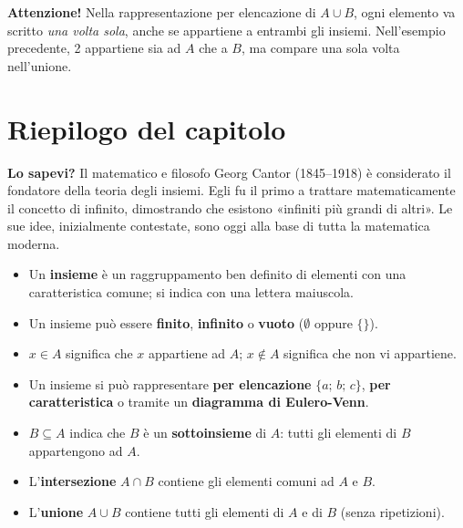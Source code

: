 \begin{attenzione}
\textbf{Attenzione!} Nella rappresentazione per elencazione di $A \cup B$, ogni elemento va scritto \emph{una volta sola}, anche se appartiene a entrambi gli insiemi. Nell'esempio precedente, 2 appartiene sia ad $A$ che a $B$, ma compare una sola volta nell'unione.
\end{attenzione}

\section*{Riepilogo del capitolo}

\begin{sapevi}
\textbf{Lo sapevi?} Il matematico e filosofo Georg Cantor (1845–1918) è considerato il fondatore della teoria degli insiemi. Egli fu il primo a trattare matematicamente il concetto di infinito, dimostrando che esistono «infiniti più grandi di altri». Le sue idee, inizialmente contestate, sono oggi alla base di tutta la matematica moderna.
\end{sapevi}

\bigskip

\begin{tcolorbox}[
  enhanced,
  breakable,
  colback  = azzurro,
  colframe = blu,
  fonttitle = \bfseries,
  title    = Riepilogo,
  left=6pt, right=6pt, top=4pt, bottom=4pt, arc=4pt
]
\begin{itemize}[leftmargin=1.5em]
  \item Un \textbf{insieme} è un raggruppamento ben definito di elementi con una caratteristica comune; si indica con una lettera maiuscola.
  \item Un insieme può essere \textbf{finito}, \textbf{infinito} o \textbf{vuoto} ($\emptyset$ oppure $\{\}$).
  \item $x \in A$ significa che $x$ appartiene ad $A$; $x \notin A$ significa che non vi appartiene.
  \item Un insieme si può rappresentare \textbf{per elencazione} $\{a;\,b;\,c\}$, \textbf{per caratteristica} o tramite un \textbf{diagramma di Eulero-Venn}.
  \item $B \subseteq A$ indica che $B$ è un \textbf{sottoinsieme} di $A$: tutti gli elementi di $B$ appartengono ad $A$.
  \item L'\textbf{intersezione} $A \cap B$ contiene gli elementi comuni ad $A$ e $B$.
  \item L'\textbf{unione} $A \cup B$ contiene tutti gli elementi di $A$ e di $B$ (senza ripetizioni).
\end{itemize}
\end{tcolorbox}
